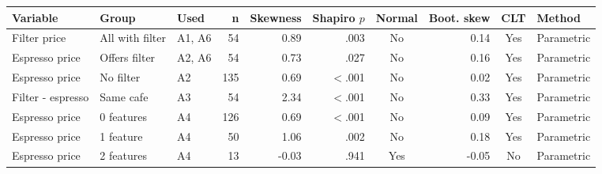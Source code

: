 \begin{tabular}{lllrrrcrcl}
\toprule
Variable & Group & Used & n & Skewness & Shapiro $p$ & Normal & Boot. skew & CLT & Method \\
\midrule
Filter price & All with filter & A1, A6 &  54 & 0.89 & .003 & No & 0.14 & Yes & Parametric \\
Espresso price & Offers filter & A2, A6 &  54 & 0.73 & .027 & No & 0.16 & Yes & Parametric \\
Espresso price & No filter & A2 & 135 & 0.69 & $<$.001 & No & 0.02 & Yes & Parametric \\
Filter - espresso & Same cafe & A3 &  54 & 2.34 & $<$.001 & No & 0.33 & Yes & Parametric \\
Espresso price & 0 features & A4 & 126 & 0.69 & $<$.001 & No & 0.09 & Yes & Parametric \\
Espresso price & 1 feature & A4 &  50 & 1.06 & .002 & No & 0.18 & Yes & Parametric \\
Espresso price & 2 features & A4 &  13 & -0.03 & .941 & Yes & -0.05 & No & Parametric \\
\bottomrule
\end{tabular}
